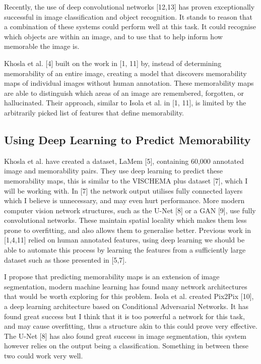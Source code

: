 \documentclass[11pt]{article}
\begin{document}
Recently, the use of deep convolutional networks [12,13] has proven exceptionally successful in image classification and object recognition. It stands to reason that a combination of these systems could perform well at this task. It could recognise which objects are within an image, and to use that to help inform how memorable the image is.

Khosla et al. [4] built on the work in [1, 11] by, instead of determining memorability of an entire image, creating a model that discovers memorability maps of individual images without human annotation. These memorability maps are able to distinguish which areas of an image are remembered, forgotten, or hallucinated. Their approach, similar to Isola et al. in [1, 11], is limited by the arbitrarily picked list of features that define memorability.

\subsection{Using Deep Learning to Predict Memorability}

Khosla et al. have created a dataset, LaMem [5], containing 60,000 annotated image and memorability pairs. They use deep learning to predict these memorability maps, this is similar to the VISCHEMA plus dataset [7], which I will be working with. In [7] the network output utilises fully connected layers which I believe is unnecessary, and may even hurt performance. More modern computer vision network structures, such as the U-Net [8] or a GAN [9], use fully convolutional networks. These maintain spatial locality which makes them less prone to overfitting, and also allows them to generalise better. Previous work in [1,4,11] relied on human annotated features, using deep learning we should be able to automate this process by learning the features from a sufficiently large dataset such as those presented in [5,7].

I propose that predicting memorability maps is an extension of image segmentation, modern machine learning has found many network architectures that would be worth exploring for this problem. Isola et al. created Pix2Pix [10], a deep learning architecture based on Conditional Adversarial Networks. It has found great success but I think that it is too powerful a network for this task, and may cause overfitting, thus a structure akin to this could prove very effective. The U-Net [8] has also found great success in image segmentation, this system however relies on the output being a classification. Something in between these two could work very well.
\end{document}
